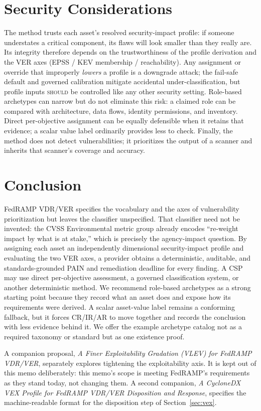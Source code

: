 \documentclass[11pt]{article}
\newcommand{\rfckw}[1]{\textsc{#1}}
\begin{document}
\section{Security Considerations}
\label{sec:seccon}
The method trusts each asset's resolved security-impact profile: if someone
understates a critical component, its flaws will look smaller than they really are.
Its integrity therefore depends on the trustworthiness of the profile derivation
and the VER axes (EPSS / KEV membership / reachability). Any assignment or override
that improperly \emph{lowers} a profile is a downgrade attack; the fail-safe default
and governed calibration mitigate accidental under-classification, but profile
inputs \rfckw{should} be controlled like any other security setting. Role-based
archetypes can narrow but do not eliminate this risk: a claimed role can be compared
with architecture, data flows, identity permissions, and inventory. Direct
per-objective assignment can be equally defensible when it retains that evidence;
a scalar value label ordinarily provides less to check. Finally, the method does
not detect vulnerabilities; it prioritizes the output of a scanner and inherits
that scanner's coverage and accuracy.

\section{Conclusion}
FedRAMP VDR/VER specifies the vocabulary and the axes of vulnerability
prioritization but leaves the classifier unspecified. That classifier need not be
invented: the CVSS Environmental metric group already encodes ``re-weight impact by
what is at stake,'' which is precisely the agency-impact question. By assigning each
asset an independently dimensional security-impact profile and evaluating the two
VER axes, a provider obtains a
deterministic, auditable, and standards-grounded PAIN and remediation deadline for
every finding. A CSP may use direct per-objective assessment, a governed
classification system, or another deterministic method. We recommend role-based
archetypes as a strong starting point because they record what an asset does and
expose how its requirements were derived. A scalar asset-value label remains a
conforming fallback, but it forces CR/IR/AR to move together and records the
conclusion with less evidence behind it. We offer the example archetype catalog not
as a required taxonomy or standard but as one existence proof.

A companion proposal, \emph{A Finer Exploitability Gradation (VLEV) for FedRAMP
VDR/VER}, separately explores tightening the exploitability axis. It is kept out of
this memo deliberately: this memo's scope is meeting FedRAMP's requirements as they
stand today, not changing them. A second companion, \emph{A CycloneDX VEX Profile for
FedRAMP VDR/VER Disposition and Response}, specifies the machine-readable format
for the disposition step of Section~\ref{sec:vex}.
\end{document}
